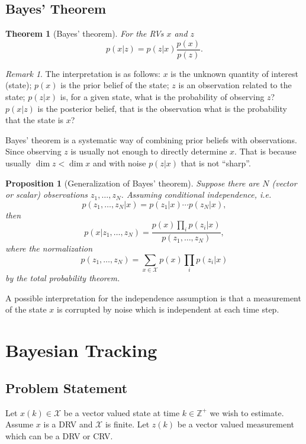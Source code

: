 \documentclass[margin=small]{hsrzf}
\theoremstyle{plain}
\newtheorem{thm}{Theorem}[section]
\newtheorem{prop}{Proposition}[section]
\theoremstyle{definition}
\theoremstyle{remark}
\newtheorem*{remark}{Remark}
\begin{document}
\subsection{Bayes' Theorem}

\begin{thm}[Bayes' theorem] For the RVs $x$ and $z$
\[
  p(x|z) = p(z|x)\frac{p(x)}{p(z)}.
\]
\end{thm}

\begin{remark}
  The interpretation is as follows: $x$ is the unknown quantity of interest
  (state); $p(x)$ is the prior belief of the state; $z$ is an observation
  related to the state; $p(z|x)$ is, for a given state, what is the
  probability of observing $z$? $p(x|z)$ is the posterior belief, that is the
  observation what is the probability that the state is $x$?
\end{remark}

Bayes' theorem is a systematic way of combining prior beliefs with
observations. Since observing $z$ is usually not enough to directly determine
$x$. That is because usually $\dim z < \dim x$ and with noise $p(z|x)$ that is not
``sharp''.

\begin{prop}[Generalization of Bayes' theorem]
  Suppose there are $N$ (vector or scalar) observations $z_1, \ldots, z_N$.
  Assuming conditional independence, i.e.
  \[
    p(z_1, \ldots, z_N|x) = p(z_1|x) \cdots p(z_N|x),
  \]
  then
  \[
    p(x|z_1, \ldots, z_N) 
      = \frac{p(x) \prod_i p(z_i | x)}{p(z_1, \ldots, z_N)},
  \]
  where the normalization
  \[
    p(z_1, \ldots, z_N) = \sum_{x \in \mathcal{X}} p(x) \prod_i p(z_i | x)
  \]
  by the total probability theorem.
\end{prop}
A possible interpretation for the independence assumption is that a
measurement of the state $x$ is corrupted by noise which is independent at
each time step.

\section{Bayesian Tracking}

\subsection{Problem Statement}

Let $x(k) \in \mathcal{X}$ be a vector valued state at time $k \in
\mathbb{Z}^+$ we wish to estimate. Assume $x$ is a DRV and $\mathcal{X}$ is
finite. Let $z(k)$ be a vector valued measurement which can be a DRV or CRV.
\end{document}
